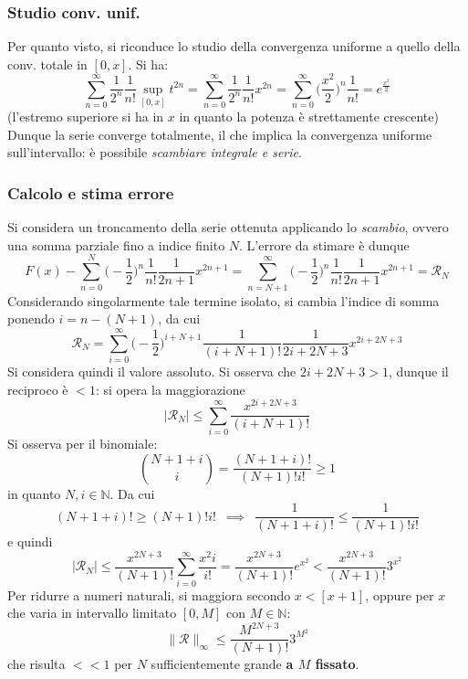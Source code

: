\documentclass[10pt]{article}
\theoremstyle{plain}
\begin{document}
\subsubsection*{Studio conv. unif.}
Per quanto visto, si riconduce lo studio della convergenza uniforme a quello della conv. totale in $[0, x]$. Si ha:
\[\sum\limits_{n=0}^\infty \frac{1}{2^n} \frac{1}{n!} \sup\limits_{[0,x]}t^{2n} = \sum\limits_{n=0}^\infty \frac{1}{2^n} \frac{1}{n!} x^{2n} = \sum\limits_{n=0}^\infty \big(\frac{x^2}{2}\big)^n \frac{1}{n!} = e^{\displaystyle \frac{x^2}{2}}\]
(l'estremo superiore si ha in $x$ in quanto la potenza è strettamente crescente)
\\Dunque la serie converge totalmente, il che implica la convergenza uniforme sull'intervallo: è possibile \textit{scambiare integrale e serie}.

\subsubsection*{Calcolo e stima errore}
Si considera un troncamento della serie ottenuta applicando lo \textit{scambio}, ovvero una somma parziale fino a indice finito $N$. L'errore da stimare è dunque
\[F(x) - \sum\limits_{n=0}^N \big( - \frac{1}{2}\big)^n\frac{1}{n!}\frac{1}{2n + 1}x^{2n + 1} = \sum\limits_{n=N+1}^\infty \big( - \frac{1}{2}\big)^n\frac{1}{n!}\frac{1}{2n + 1}x^{2n + 1} = \mathcal{R}_N\]
Considerando singolarmente tale termine isolato, si cambia l'indice di somma ponendo $i = n - (N+1)$, da cui
\[\mathcal{R}_N = \sum\limits_{i=0}^\infty \big( - \frac{1}{2}\big)^{i + N + 1}\frac{1}{(i + N + 1)!}\frac{1}{2i + 2N + 3}x^{2i + 2N + 3}\]
Si considera quindi il valore assoluto. Si osserva che $2i + 2N + 3 > 1$, dunque il reciproco è $< 1$: si opera la maggiorazione
\[|\mathcal{R}_N| \leq \sum\limits_{i=0}^\infty \frac{x^{2i + 2N + 3}}{(i + N + 1)!}\]
Si osserva per il binomiale:
\[\binom{N + 1 + i}{i} = \frac{(N + 1 + i)!}{(N+1)! i!} \geq 1\]
in quanto $N, i \in \mathbb{N}$. Da cui
\[(N+1+i)! \geq (N+1)! i! \enspace \implies \enspace \frac{1}{(N+1+i)!} \leq \frac{1}{(N+1)! i!}\]
e quindi
\[|\mathcal{R}_N| \leq \frac{x^{2N + 3}}{(N+1)!}\sum\limits_{i=0}^\infty \frac{x^2i}{i!} = \frac{x^{2N + 3}}{(N+1)!} e^{x^2} < \frac{x^{2N + 3}}{(N+1)!}3^{x^2}\]
Per ridurre a numeri naturali, si maggiora secondo $x < [x+1]$, oppure per $x$ che varia in intervallo limitato $[0,M]$ con $M \in \mathbb{N}$:
\[\|\mathcal{R}\|_\infty \leq \frac{M^{2N + 3}}{(N+1)!}3^{M^2}\]
che risulta $<< 1$ per $N$ sufficientemente grande \textbf{a $M$ fissato}.
\end{document}
